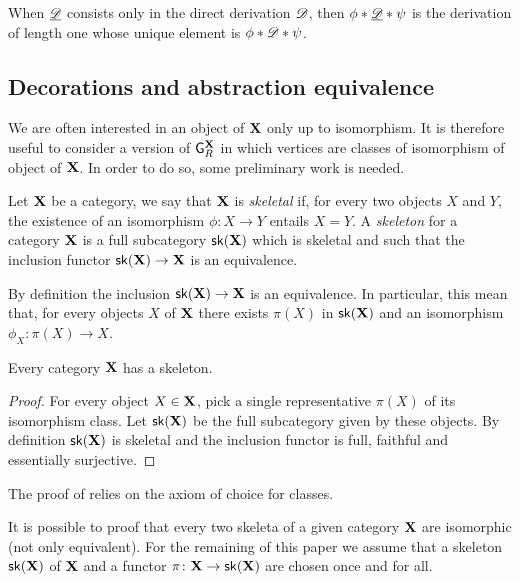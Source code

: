 \begin{remark}
When $\underline{\mathscr{D}}$ consists only in the direct derivation $\mathscr{D}$, then $\phi*\underline{\mathscr{D}}*\psi$ is the derivation of length one whose unique element is $\phi*\mathscr{D}*\psi$.
\end{remark}

\subsection{Decorations and abstraction equivalence}
We are often interested in an object of $\textbf {\textup{X}}$ only up to isomorphism. It is therefore useful to consider a version of $\mathsf{G}^{\textbf {\textup{X}}}_R$ in which vertices are classes of isomorphism of object of $\textbf {\textup{X}}$. In order to do so, some preliminary work is needed.

\begin{definition}\cite{mac2013categories}
Let $\textbf {\textup{X}}$ be a category, we say that  $\textbf {\textup{X}}$ is \emph{skeletal} if, for every two objects $X$ and $Y$, the existence of an isomorphism $\phi\colon X\to Y$ entails $X=Y$. A \emph{skeleton} for a category $\textbf {\textup{X}}$ is a full subcategory $\mathsf{sk}(\textbf {\textup{X}})$ which is skeletal and such that the inclusion functor $\mathsf{sk}(\textbf {\textup{X}})\to \textbf {\textup{X}}$ is an equivalence. 
\end{definition}

\begin{remark}
By definition the inclusion $\mathsf{sk}(\textbf {\textup{X}}) \to \textbf {\textup{X}}$ is an equivalence. In particular, this mean that, for every objects $X$ of $\textbf {\textup{X}}$ there exists $\pi(X)$ in $\mathsf{sk}(\textbf {\textup{X}})$ and an isomorphism $\phi_X\colon \pi(X) \to X$.
\end{remark}

\begin{proposition}\label{prop:ske}
	Every category $\textbf {\textup{X}}$ has a skeleton. 
\end{proposition}
\begin{proof}
	For every object $X\in \textbf {\textup{X}}$, pick a single representative $\pi(X)$ of its isomorphism class. Let $\mathsf{sk}(\textbf {\textup{X}})$ be the full subcategory given by these objects. By definition $\mathsf{sk}(\textbf {\textup{X}})$ is skeletal and the inclusion functor is full, faithful and essentially surjective.\qedhere 
\end{proof}
\begin{remark}
	The proof of  relies on the axiom of choice for classes.
	\end{remark}
\begin{remark}
	It is possible to proof that every two skeleta of a given category $\textbf {\textup{X}}$ are isomorphic (not only equivalent). For the remaining of this paper we assume that a skeleton $\mathsf{sk}(\textbf {\textup{X}})$ of $\textbf {\textup{X}}$ and a functor $\pi\colon \textbf {\textup{X}}\to \mathsf{sk}(\textbf {\textup{X}})$ are chosen once and for all.
\end{remark}

